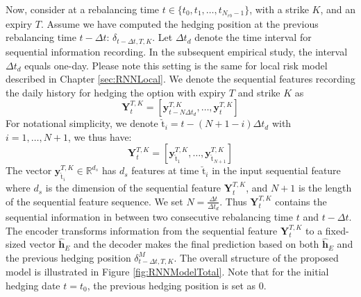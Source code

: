 \documentclass[letterpaper,12pt,titlepage,oneside,final]{book}
\numberwithin{equation}{section}
\theoremstyle{definition}
\newcommand{\vy}{\mathbf{y}}
\newcommand{\DT}{\Delta t}
\newcommand{\Real}{\mathbb{R}}
\newcommand{\nt}{\breve{\text{t}}}
\begin{document}
Now, consider at a  rebalancing time $t \in \{t_0,t_1, \dots, t_{N_{rb}-1}\}$, with a strike $K$, and an expiry $T$. Assume we have computed the hedging position at the previous rebalancing time $t-\Delta t$: $\delta_{t-\Delta t, T,K}$. Let $\DT_{d}$ denote the time interval for sequential information recording. In  the subsequent empirical study, the interval $\DT_{d}$ equals one-day. Please note this setting is the same for local risk model described in Chapter \ref{sec:RNNLocal}.  We denote the sequential features recording the daily history  for hedging the option with expiry $T$ and strike $K$ as
\[
\mathbf{Y}_{t}^{T,K}=\left[\vy^{T,K}_{t-N \DT_{d}},\dots,\vy^{T,K}_{t}\right]
\]
For notational simplicity, we denote $\nt_i=t-(N+1-i)\DT_d$ with $i=1, \dots,N+1$, we thus have:
\[
\mathbf{Y}_{t}^{T,K}=\left[\vy^{T,K}_{\nt_{1}},\dots,\vy^{T,K}_{\nt_{N+1}}\right]
\]
The vector $\vy^{T,K}_{\nt_{i}} \in \Real^{d_s}$ has  $d_s$ features at time $\nt_{i}$ in the input sequential feature where
$d_s$ is the dimension of the sequential feature $\mathbf{Y}_{t}^{T,K}$, and
$N+1$ is the length of the sequential feature sequence. We set $N=\frac{\Delta t}{\Delta t_d}$. Thus $\mathbf{Y}_{t}^{T,K}$ contains the sequential information in between two consecutive rebalancing time $t$ and $t-\Delta t$.
The encoder transforms information from the sequential feature $\mathbf{Y}_{t}^{T,K}$ to  a fixed-sized vector
$\mathbf{\widehat{h}}_E$   and the decoder makes the final prediction based on both $\mathbf{\widehat{h}}_E$  and the previous hedging position $\delta^{M}_{t-\Delta t,T,K}$. The overall structure of the proposed model is illustrated in Figure \ref{fig:RNNModelTotal}. Note that for the initial hedging date $t=t_0$, the previous hedging position is set as $0$.
\end{document}
